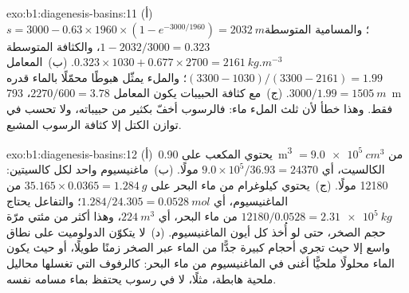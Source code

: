 \begin{solution}{exo:b1:diagenesis-basins:11}
(أ)~$s = 3000 - 0.63\times1960\times(1 - e^{-3000/1960}) = \qty{2032}{m}$؛ والمسامية المتوسطة $1 - 2032/3000 = \num{0.323}$، والكثافة المتوسطة $0.323\times1030 + 0.677\times2700 = \qty{2161}{kg.m^{-3}}$. (ب)~المعامل $(3300 - 1030)/(3300 - 2161) = \num{1.99}$؛ والملء يمثّل هبوطًا محمّلًا بالماء قدره $3000/1.99 = \qty{1505}{m}$. (ج)~مع كثافة الحبيبات يكون المعامل $2270/600 = \num{3.78}$،  \qty{793}{m} فقط. وهذا خطأ لأن ثلث الملء ماء: فالرسوب أخفّ بكثير من حبيباته، ولا تحسب في توازن الكتل إلا كثافة الرسوب المشبع.
\end{solution}

\begin{solution}{exo:b1:diagenesis-basins:12}
(أ)~يحتوي المكعب على \qty{0.90}{m^3} $= \qty{9.0e5}{cm^3}$ من الكالسيت، أي $9.0\times10^5/36.93 = \num{24370}$ مولًا. (ب)~ماغنيسيوم واحد لكل كالسيتين: \num{12180} مولًا. (ج)~يحتوي كيلوغرام من ماء البحر على $35.165\times0.0365 =
\qty{1.284}{g}$ من الماغنيسيوم، أي $1.284/24.305 = \qty{0.0528}{mol}$؛ والتفاعل يحتاج $12180/0.0528 = \qty{2.31e5}{kg}$ من ماء البحر، أي $\qty{224}{m^3}$، وهذا أكثر من مئتي مرّة حجم الصخر، حتى لو أُخذ كل أيون الماغنيسيوم. (د)~لا يتكوّن الدولوميت على نطاق واسع إلا حيث تجري أحجام كبيرة جدًّا من الماء عبر الصخر زمنًا طويلًا، أو حيث يكون الماء محلولًا ملحيًّا أغنى في الماغنيسيوم من ماء البحر: كالرفوف التي تغسلها محاليل ملحية هابطة، مثلًا، لا في رسوب يحتفظ بماء مسامه نفسه.
\end{solution}

